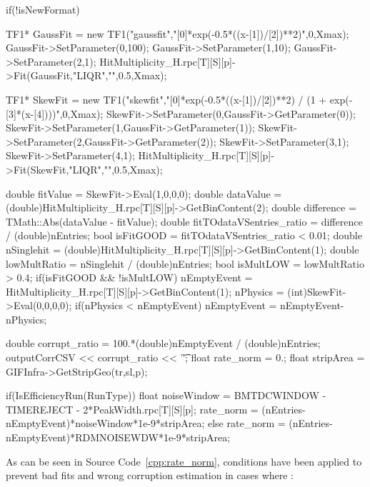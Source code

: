 \endgroup
	
	\begin{code}
	\begin{cppcode}
if(!isNewFormat){
	TF1* GaussFit = new TF1("gaussfit","[0]*exp(-0.5*((x-[1])/[2])**2)",0,Xmax);
	GaussFit->SetParameter(0,100);
	GaussFit->SetParameter(1,10);
	GaussFit->SetParameter(2,1);
	HitMultiplicity_H.rpc[T][S][p]->Fit(GaussFit,"LIQR","",0.5,Xmax);

	TF1* SkewFit = new TF1("skewfit","[0]*exp(-0.5*((x-[1])/[2])**2) / (1 + exp(-[3]*(x-[4])))",0,Xmax);
	SkewFit->SetParameter(0,GaussFit->GetParameter(0));
	SkewFit->SetParameter(1,GaussFit->GetParameter(1));
	SkewFit->SetParameter(2,GaussFit->GetParameter(2));
	SkewFit->SetParameter(3,1);
	SkewFit->SetParameter(4,1);
	HitMultiplicity_H.rpc[T][S][p]->Fit(SkewFit,"LIQR","",0.5,Xmax);

	double fitValue = SkewFit->Eval(1,0,0,0);
	double dataValue = (double)HitMultiplicity_H.rpc[T][S][p]->GetBinContent(2);
	double difference = TMath::Abs(dataValue - fitValue);
	double fitTOdataVSentries_ratio = difference / (double)nEntries;
	bool isFitGOOD = fitTOdataVSentries_ratio < 0.01;
	double nSinglehit = (double)HitMultiplicity_H.rpc[T][S][p]->GetBinContent(1);
	double lowMultRatio = nSinglehit / (double)nEntries;
	bool isMultLOW = lowMultRatio > 0.4;
	if(isFitGOOD && !isMultLOW){
		nEmptyEvent = HitMultiplicity_H.rpc[T][S][p]->GetBinContent(1);
		nPhysics = (int)SkewFit->Eval(0,0,0,0);
		if(nPhysics < nEmptyEvent)
		nEmptyEvent = nEmptyEvent-nPhysics;
	}
}
double corrupt_ratio = 100.*(double)nEmptyEvent / (double)nEntries;
outputCorrCSV << corrupt_ratio << '\t';
float rate_norm = 0.;
float stripArea = GIFInfra->GetStripGeo(tr,sl,p);	
	
if(IsEfficiencyRun(RunType)){
	float noiseWindow = BMTDCWINDOW - TIMEREJECT - 2*PeakWidth.rpc[T][S][p];
	rate_norm = (nEntries-nEmptyEvent)*noiseWindow*1e-9*stripArea;
} else
	rate_norm = (nEntries-nEmptyEvent)*RDMNOISEWDW*1e-9*stripArea;
	\end{cppcode}
	\label{cpp:rate_norm}
	\vspace{5mm}
	\end{code}
	
	As can be seen in Source Code~\ref{cpp:rate_norm}, conditions have been applied to prevent bad fits and wrong corruption estimation in cases where :

